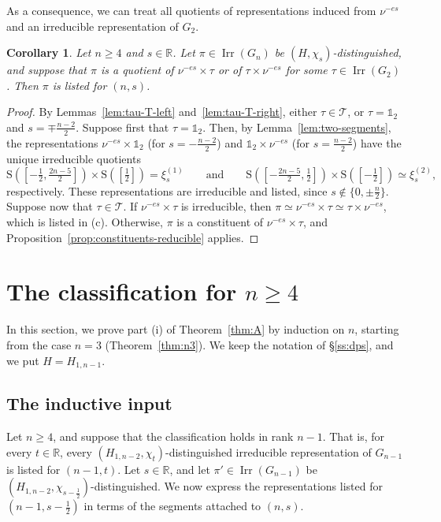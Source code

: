 \documentclass[11pt]{amsart}
\numberwithin{equation}{section}
\theoremstyle{plain}
\newtheorem{corollary}[theorem]{Corollary}
\theoremstyle{definition}
\theoremstyle{remark}
\newcommand{\R}{\mathbb{R}}
\newcommand{\one}{\mathds{1}}
\newcommand{\T}{\mathcal{T}}
\DeclareMathOperator{\Irr}{Irr}
\newcommand{\xione}{\xi^{(1)}}
\newcommand{\xitwo}{\xi^{(2)}}
\newcommand{\Ss}{\mathrm{S}}
\begin{document}
As a consequence, we can treat all quotients of representations induced from $\nu^{-es}$ and an irreducible representation of $G_2$.

\begin{corollary}\label{cor:quotient-nu-tau-listed}
	Let $n\ge4$ and $s\in\R$. Let $\pi\in\Irr(G_n)$ be $(H,\chi_s)$-distinguished, and suppose that $\pi$ is a quotient of $\nu^{-es}\times\tau$ or of $\tau\times\nu^{-es}$ for some $\tau\in\Irr(G_2)$. Then $\pi$ is listed for $(n,s)$.
\end{corollary}

\begin{proof}
	By Lemmas~\ref{lem:tau-T-left} and~\ref{lem:tau-T-right}, either $\tau\in\T$, or $\tau=\one_2$ and $s=\mp\frac{n-2}2$. Suppose first that $\tau=\one_2$. Then, by Lemma~\ref{lem:two-segments}, the representations $\nu^{-es}\times\one_2$ (for $s=-\frac{n-2}2$) and $\one_2\times\nu^{-es}$ (for $s=\frac{n-2}2$) have the unique irreducible quotients
	$$
	\Ss([-\tfrac12,\tfrac{2n-5}2])\times\Ss([\tfrac12])=\xione_s\qquad\text{and}\qquad\Ss([-\tfrac{2n-5}2,\tfrac12])\times\Ss([-\tfrac12])\simeq\xitwo_s,$$
	respectively. These representations are irreducible and listed, since $s\notin\{0,\pm\frac n2\}$. Suppose now that $\tau\in\T$. If $\nu^{-es}\times\tau$ is irreducible, then $\pi\simeq\nu^{-es}\times\tau\simeq\tau\times\nu^{-es}$, which is listed in (c). Otherwise, $\pi$ is a constituent of $\nu^{-es}\times\tau$, and Proposition~\ref{prop:constituents-reducible} applies.
\end{proof}

\section{The classification for \texorpdfstring{$n\ge4$}{n>=4}}\label{sec:induction}

In this section, we prove part (i) of Theorem~\ref{thm:A} by induction on $n$, starting from the case $n=3$ (Theorem~\ref{thm:n3}). We keep the notation of \S\ref{ss:dps}, and we put $H=H_{1,n-1}$.

\subsection{The inductive input}\label{ss:inductive-input}

Let $n\ge4$, and suppose that the classification holds in rank $n-1$. That is, for every $t\in\R$, every $(H_{1,n-2},\chi_t)$-distinguished irreducible representation of $G_{n-1}$ is listed for $(n-1,t)$. Let $s\in\R$, and let $\pi'\in\Irr(G_{n-1})$ be $(H_{1,n-2},\chi_{s-\frac12})$-distinguished. We now express the representations listed for $(n-1,s-\frac12)$ in terms of the segments attached to $(n,s)$.
\end{document}
